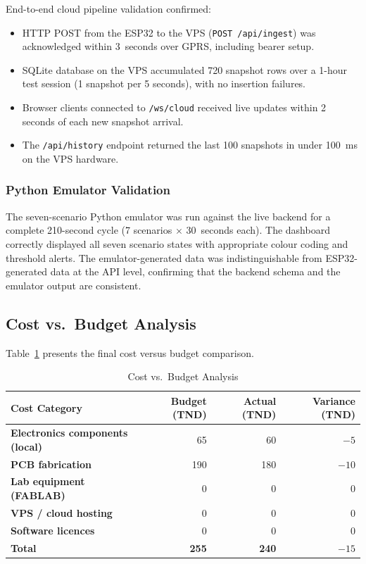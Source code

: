 End-to-end cloud pipeline validation confirmed:
\begin{itemize}
    \item HTTP POST from the ESP32 to the VPS (\texttt{POST /api/ingest}) was acknowledged within 3~seconds over GPRS, including bearer setup.
    \item SQLite database on the VPS accumulated 720 snapshot rows over a 1-hour test session (1 snapshot per 5 seconds), with no insertion failures.
    \item Browser clients connected to \texttt{/ws/cloud} received live updates within 2 seconds of each new snapshot arrival.
    \item The \texttt{/api/history} endpoint returned the last 100 snapshots in under 100~ms on the VPS hardware.
\end{itemize}

\subsubsection{Python Emulator Validation}

The seven-scenario Python emulator was run against the live backend for a complete 210-second cycle (7 scenarios $\times$ 30~seconds each). The dashboard correctly displayed all seven scenario states with appropriate colour coding and threshold alerts. The emulator-generated data was indistinguishable from ESP32-generated data at the API level, confirming that the backend schema and the emulator output are consistent.

\subsection{Cost vs.\ Budget Analysis}

Table~\ref{tab:cost-analysis} presents the final cost versus budget comparison.

\begin{table}[H]
\centering
\caption{Cost vs.\ Budget Analysis}
\label{tab:cost-analysis}
\begin{tabular}{>{\bfseries}p{4.5cm} r r r}
\toprule
Cost Category & Budget (TND) & Actual (TND) & Variance (TND) \\
\midrule
Electronics components (local) & 65  & 60  & $-5$ \\
PCB fabrication                 & 190 & 180 & $-10$ \\
Lab equipment (FABLAB)          & 0   & 0   & 0 \\
VPS / cloud hosting             & 0   & 0   & 0 \\
Software licences               & 0   & 0   & 0 \\
\midrule
\textbf{Total}                  & \textbf{255} & \textbf{240} & \textbf{$-15$} \\
\bottomrule
\end{tabular}
\end{table}

